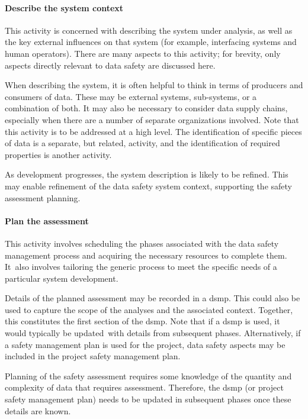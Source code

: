 \paragraph{Describe the system context}
This activity is concerned with describing the system under analysis, as well as the key external influences on that system (\cbstart for example, interfacing systems and human operators). There are many aspects to this activity; for brevity, only aspects directly relevant to data safety are discussed here\cbend.

\cbstart When describing the system, it is often helpful to think in terms of producers and consumers of data. These may be external systems, sub-systems, or a combination of both. It may also be necessary to consider data supply chains, especially when there are a number of separate organizations involved. Note that this activity is to be addressed at a high level. The identification of specific pieces of data is a separate, but related, activity, and the identification of required properties is another activity\cbend.

\cbstart As development progresses, the system description is likely to be refined. This may enable refinement of the data safety system context, supporting the \gls{safety assessment} planning.\cbend\

\paragraph{Plan the assessment}
This activity involves scheduling the phases associated with the data safety management process and acquiring the necessary resources to complete them. \cbstart It\cbend\ also involves tailoring the generic process to meet the specific needs of a particular system development. 

Details of the planned assessment may be recorded in a \gls{dsmp}. This could also be used to capture the scope of the analyses and the associated context. Together, \cbstart this constitutes the first section of the \gls{dsmp}\cbend. Note that if a \gls{dsmp} is \cbstart used, it would typically be updated\cbend\ with details from subsequent phases. Alternatively, if a safety management plan \cbstart is used for the project, data safety aspects may be included in the project safety management plan\cbend. 

Planning of the \gls{safety assessment} requires some knowledge of the quantity and complexity of data that requires assessment. Therefore, the \gls{dsmp} (or \cbstart project safety management plan) needs to be updated in subsequent phases once these details are known.\cbend\

